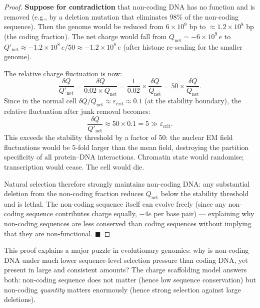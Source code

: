 \begin{proof}
\textbf{Suppose for contradiction} that non-coding DNA has no function
and is removed (e.g., by a deletion mutation that eliminates 98\% of
the non-coding sequence). Then the genome would be reduced from
$6\times 10^9$ bp to $\approx 1.2\times 10^8$ bp (the coding fraction).
The net charge would fall from $Q_{\mathrm{net}} = -6\times 10^9\,e$ to
$Q'_{\mathrm{net}} \approx -1.2\times 10^8\,e / 50 \approx -1.2\times
10^8\,e$ (after histone re-scaling for the smaller genome).

The relative charge fluctuation is now:
\begin{equation}
  \frac{\delta Q}{Q'_{\mathrm{net}}} = \frac{\delta Q}{0.02 \times Q_{\mathrm{net}}}
    = \frac{1}{0.02} \times \frac{\delta Q}{Q_{\mathrm{net}}}
    = 50 \times \frac{\delta Q}{Q_{\mathrm{net}}}.
  \label{eq:junk_removal}
\end{equation}
Since in the normal cell $\delta Q / Q_{\mathrm{net}} \approx
\varepsilon_{\mathrm{crit}} \approx 0.1$ (at the stability boundary),
the relative fluctuation after junk removal becomes:
\begin{equation}
  \frac{\delta Q}{Q'_{\mathrm{net}}} \approx 50 \times 0.1 = 5 \gg \varepsilon_{\mathrm{crit}}.
  \label{eq:junk_catastrophe}
\end{equation}
This exceeds the stability threshold by a factor of 50: the nuclear
EM field fluctuations would be $5$-fold larger than the mean field,
destroying the partition specificity of all protein--DNA interactions.
Chromatin state would randomise; transcription would cease. The cell
would die.

Natural selection therefore strongly maintains non-coding DNA: any
substantial deletion from the non-coding fraction reduces $Q_{\mathrm{net}}$
below the stability threshold and is lethal. The non-coding sequence
itself can evolve freely (since any non-coding sequence contributes
charge equally, $-4e$ per base pair) --- explaining why non-coding
sequences are less conserved than coding sequences without implying that
they are non-functional. $\blacksquare$
\end{proof}

\begin{remark}
This proof explains a major puzzle in evolutionary genomics: why is
non-coding DNA under much lower sequence-level selection pressure than
coding DNA, yet present in large and consistent amounts? The charge
scaffolding model answers both: non-coding sequence does not matter
(hence low sequence conservation) but non-coding \emph{quantity} matters
enormously (hence strong selection against large deletions).
\end{remark}

